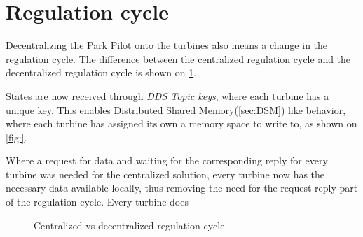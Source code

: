 \section{Regulation cycle}

Decentralizing the Park Pilot onto the turbines also means a change in the regulation cycle. The difference between the centralized regulation cycle and the decentralized regulation cycle is shown on \cref{fig:cycleCentralVSDecentral}. 

States are now received through \textit{DDS Topic keys}, where each turbine has a unique key. This enables Distributed Shared Memory(\cref{sec:DSM}) like behavior, where each turbine has assigned its own a memory space to write to, as shown on \cref{fig:}.

Where a request for data and waiting for the corresponding reply for every turbine was needed for the centralized solution, every turbine now has the necessary data available locally, thus removing the need for the request-reply part of the regulation cycle. Every turbine does 


%	

\begin{figure}[b]

	{}
	\newline
	
	\newline
	
	{}
	\newline
	
	\caption{Centralized vs decentralized regulation cycle}
	\label{fig:cycleCentralVSDecentral}
\end{figure}

